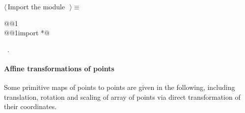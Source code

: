 \documentclass[11pt,oneside]{article}	%
\begin{document}
\begin{flushleft} \small \label{scrap48}
$\langle\,$Import the module\nobreak\ {\footnotesize {}}$\,\rangle\equiv$
\vspace{-1ex}
\begin{list}{}{} \item
\mbox{}\verb@import @@1\verb@@\\
\mbox{}\verb@from @@1\verb@ import *@\\
\mbox{}\verb@@{\NWsep}
\end{list}
\vspace{-1ex}
\footnotesize\addtolength{\baselineskip}{-1ex}
\begin{list}{}{\setlength{\itemsep}{-\parsep}\setlength{\itemindent}{-\leftmargin}}
\item \NWtxtMacroRefIn\ .
\end{list}
\end{flushleft}

\paragraph{Affine transformations of points} Some primitive maps of points to points are given in the following, including translation, rotation and scaling of array of points via direct transformation of their coordinates.
\end{document}

